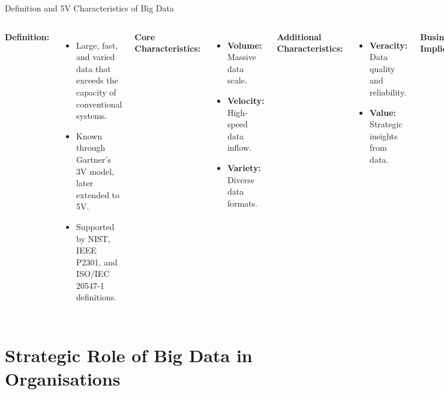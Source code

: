 \documentclass[aspectratio=169, table]{beamer}
\begin{document}
\begin{frame}[fragile]{Definition and 5V Characteristics of Big Data}
	\vspace{20pt}
	\small
	\begin{columns}[T]
		\textbf{Definition:}
		\begin{itemize}
			\item Large, fast, and varied data that exceeds the capacity of conventional systems.
			\item Known through Gartner's 3V model, later extended to 5V.
			\item Supported by NIST, IEEE P2301, and ISO/IEC 20547-1 definitions.
		\end{itemize}
		
		\textbf{Core Characteristics:}
		\begin{itemize}
			\item \textbf{Volume:} Massive data scale.
			\item \textbf{Velocity:} High-speed data inflow.
			\item \textbf{Variety:} Diverse data formats.
		\end{itemize}
		
		\textbf{Additional Characteristics:}
		\begin{itemize}
			\item \textbf{Veracity:} Data quality and reliability.
			\item \textbf{Value:} Strategic insights from data.
		\end{itemize}
		
		\textbf{Business Implications:}
		\begin{itemize}
			\item Organisations require effective data management strategies.
			\item Leveraging the 5V helps achieve competitive advantage.
		\end{itemize}
	\end{columns}
\end{frame}


\section{Strategic Role of Big Data in Organisations}
\end{document}
